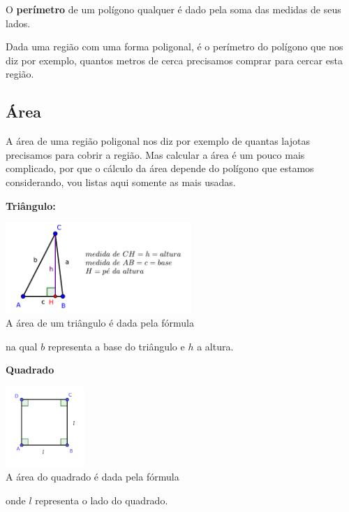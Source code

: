 \vskip0.3cm
 \colorbox{amarelo}{
 \begin{minipage}{0.9\linewidth}
 \begin{center}
  O \textbf{perímetro} de um polígono qualquer é dado pela soma das medidas de seus lados.
 \end{center}
 \end{minipage}}
 \vskip0.3cm


Dada uma região com uma forma poligonal, é o perímetro do polígono que nos diz por exemplo, quantos metros de cerca precisamos comprar para cercar esta região.

\subsection{Área}

A área de uma região poligonal nos diz por exemplo de quantas lajotas precisamos para cobrir a região. Mas calcular a área é um pouco mais complicado, por que o cálculo da área depende do polígono que estamos considerando, vou listas aqui somente as mais usadas.

\textbf{Triângulo:}
\begin{multicols}{2}

\includegraphics[width=7cm]{./cap_geometria/figs/triangulo} \\
A área de um triângulo é dada pela fórmula


na qual $b$ representa a base do triângulo e $h$ a altura.
\end{multicols}

\textbf{Quadrado}
\begin{multicols}{2}
\includegraphics[width=3cm]{./cap_geometria/figs/quadrado_L} \\
A área do quadrado é dada pela fórmula


onde $l$ representa o lado do quadrado.
\end{multicols}

